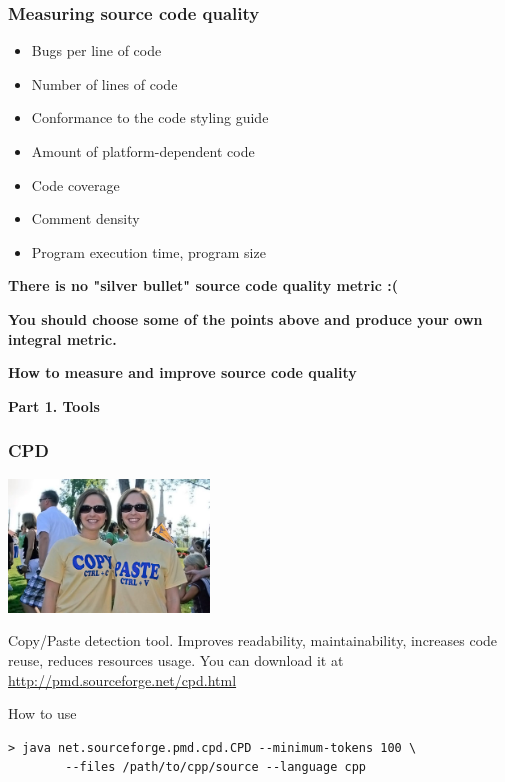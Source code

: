 \documentclass{beamer}
\begin{document}
\begin{frame}
\frametitle{Measuring source code quality}
\begin{itemize}
\item Bugs per line of code
\item Number of lines of code
\item Conformance to the code styling guide
\item Amount of platform-dependent code
\item Code coverage
\item Comment density
\item Program execution time, program size
\end{itemize}
\begin{center}
\textbf{There is no "silver bullet" source code quality metric :(}

\textbf{You should choose some of the points above and produce your own integral metric.}
\end{center}
\end{frame}

\begin{frame}
\begin{block}{\begin{center}\Large\textbf{How to measure and improve source code quality}\end{center}}
\begin{center}
\textbf{Part 1. Tools}
\end{center}
\end{block}
\end{frame}

\begin{frame}[fragile]
\frametitle{CPD}
\begin{center}
\includegraphics[width=0.4\textwidth]{img/copy-paste}
\end{center}
Copy/Paste detection tool. Improves readability, maintainability, increases code reuse, reduces resources usage. You can download it at \url{http://pmd.sourceforge.net/cpd.html}
\begin{exampleblock}{How to use}
\begin{verbatim}
> java net.sourceforge.pmd.cpd.CPD --minimum-tokens 100 \
        --files /path/to/cpp/source --language cpp
\end{verbatim}
\end{exampleblock}
\end{frame}
\end{document}
